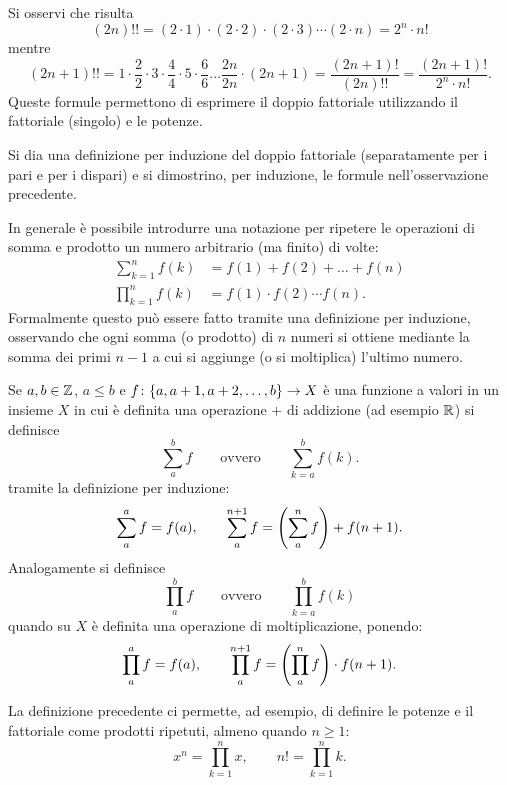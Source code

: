 \begin{remark}
Si osservi che risulta
\[
  (2n)!! = (2\cdot 1) \cdot (2\cdot 2) \cdot (2\cdot 3) \cdots (2\cdot n)
        = 2^n \cdot n!
\]
mentre
\[
  (2n+1)!! = 1 \cdot \frac{2}{2} \cdot 3 \cdot \frac{4}{4}
\cdot 5 \cdot \frac{6}{6} \dots \frac{2n}{2n} \cdot (2n+1)
= \frac{(2n+1)!}{(2n)!!}
 = \frac{(2n+1)!}{2^n \cdot n!}.
\]
Queste formule permettono di esprimere il doppio fattoriale utilizzando
il fattoriale (singolo) e le potenze.
\end{remark}

\begin{exercise}
Si dia una definizione per induzione del doppio fattoriale
(separatamente per i pari e per i dispari)
e si dimostrino, per induzione, le formule nell'osservazione precedente.
\end{exercise}

In generale è possibile introdurre una notazione per ripetere le operazioni
di somma e prodotto un numero arbitrario (ma finito) di volte:
\begin{align*}
  \sum_{k=1}^n f(k) &= f(1) + f(2) + \dots + f(n) \\
  \prod_{k=1}^n f(k) &= f(1) \cdot f(2) \cdots f(n).
\end{align*}
Formalmente questo può essere fatto tramite una definizione per induzione,
osservando che ogni somma (o prodotto) di $n$ numeri si ottiene mediante
la somma dei primi $n-1$ a cui si aggiunge (o si moltiplica) l'ultimo numero.

\begin{definition}
Se $a,b\in \mathbb Z$, $a\le b$ e $f\colon {\left\{ a, a+1, a+2, \dots, b \right\}}\to X$
è una funzione a valori in un insieme $X$ in cui è definita una
operazione $+$ di addizione (ad esempio $\mathbb R$)
si definisce
\[
  \sum_a^b f
  \qquad \text{ovvero} \qquad
  \sum_{k=a}^b f(k).
\]
tramite la definizione per induzione:
\[
    \displaystyle \sum_a^a f = f(a), \qquad
    \displaystyle \sum_{a}^{n+1} f = {\left( \sum_a^n f \right)} + f(n+1).
\]
Analogamente si definisce
\[
  \prod_a^b f
  \qquad\text{ovvero}\qquad
  \prod_{k=a}^b f(k)
\]
quando su $X$ è definita una operazione di moltiplicazione,
ponendo:
\[
    \displaystyle \prod_{a}^a f = f(a), \qquad
    \displaystyle \prod_{a}^{n+1} f = {\left( \prod_a^n f \right)} \cdot f(n+1).
\]
\end{definition}

La definizione precedente ci permette, ad esempio, di definire le potenze e il fattoriale
come prodotti ripetuti, almeno quando $n\ge 1$:
\[
  x^n = \prod_{k=1}^n x, \qquad
  n! = \prod_{k=1}^n k.
\]

